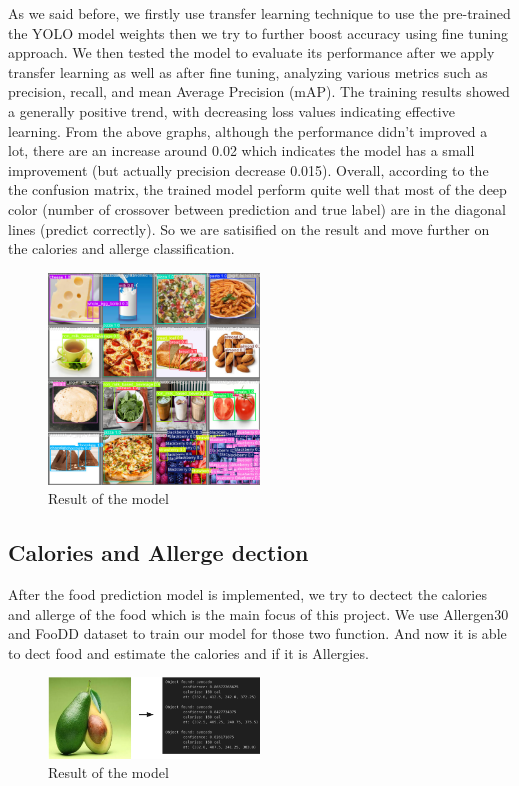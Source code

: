 \documentclass[10pt,twocolumn,letterpaper]{article}
\begin{document}
As we said before, we firstly use transfer learning technique to use the pre-trained the YOLO model weights then we try to further boost accuracy using fine tuning approach. 
We then tested the model to evaluate its performance after we apply transfer learning as well as after fine tuning, analyzing various metrics such as precision, recall, and mean Average Precision (mAP). 
The training results showed a generally positive trend, with decreasing loss values indicating effective learning. 
From the above graphs, although the performance didn't improved a lot, there are an increase around 0.02 which indicates the model has a small improvement (but actually precision decrease 0.015). 
Overall, according to the the confusion matrix, the trained model perform quite well that most of the deep color (number of crossover between prediction and true label) are in the diagonal lines (predict correctly). 
So we are satisified on the result and move further on the calories and allerge classification.
\begin{figure}[htbp]
    \centering
    \includegraphics[width=0.5\textwidth]{result.png}
    \caption{Result of the model}
    \label{fig:yourlabel}
\end{figure}
\subsection{Calories and Allerge dection}
After the food prediction model is implemented, we try to dectect the calories and allerge of the food which is the main focus of this project. 
We use Allergen30 and FooDD dataset to train our model for those two function. 
And now it is able to dect food and estimate the calories and if it is Allergies.
\begin{figure}[htbp]
    \centering
    \includegraphics[width=0.5\textwidth]{result2.png}
    \caption{Result of the model}
    \label{fig:yourlabel}
\end{figure}
\end{document}

